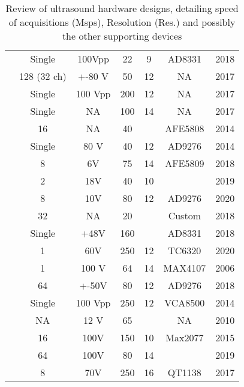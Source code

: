 \begin{table}[H]
\begin{tabular}{l|c|c|c|c|c|c}
 \cite{jonveaux_arduino-like_2017} & Single      & 100Vpp  & 22   & 9    & AD8331  & 2018 \\
 \cite{kim_smart-phone_2017}       & 128 (32 ch) & +-80 V  & 50   & 12   & NA      & 2017 \\
\cite{kruizinga_compressive_2017}  & Single      & 100 Vpp & 200  & 12   & NA      & 2017 \\
\cite{kushi_ultrasonic_2017}     & Single      & NA      & 100  & 14   & NA      & 2017 \\
\cite{lee_new_2014}             & 16          & NA      & 40   &      & AFE5808 & 2014 \\
\cite{li_new_2014}         & Single      & 80 V    & 40   & 12   & AD9276  & 2014 \\
\cite{matera_smart_2018}       & 8           & 6V      & 75   & 14   & AFE5809 & 2018 \\
\cite{nguyen_estimating_2019}    & 2           & 18V     & 40   & 10   &         & 2019 \\
\cite{pashaei_flexible_2020}      & 8           & 10V     & 80   & 12   & AD9276  & 2020 \\
 \cite{peyton_comparison_2018}     & 32          & NA      & 20   &      & Custom  & 2018 \\
\cite{qiu_delayed-excitation_2018} & Single      & +48V    & 160  &      & AD8331  & 2018 \\
\cite{qiu_ultrasound_2020}         & 1           & 60V     & 250  & 12   & TC6320  & 2020 \\
\cite{ricci_programmable_2006}   & 1           & 100 V   & 64   & 14   & MAX4107 & 2006 \\
\cite{roman_open-source_2018}   & 64          & +-50V   & 80   & 12   & AD9276  & 2018 \\
 \cite{vasudevan_programmable_2014} & Single      & 100 Vpp & 250  & 12   & VCA8500 & 2014 \\
\cite{wall_high-speed_2010}        & NA          & 12 V    & 65   &      & NA      & 2010 \\
\cite{weng_fpga-based_2015}      & 16          & 100V    & 150  & 10   & Max2077 & 2015 \\
\cite{zhang_high_2019}            & 64          & 100V    & 80   & 14   &         & 2019 \\
\cite{zhang_multi-channel_2017}     & 8           & 70V     & 250  & 16   & QT1138  & 2017    

\end{tabular} 
\caption{Review of ultrasound hardware designs, detailing speed of acquisitions (Msps), Resolution (Res.) and possibly the other supporting devices}
\label{tab:benchmarklite}
\end{table}
